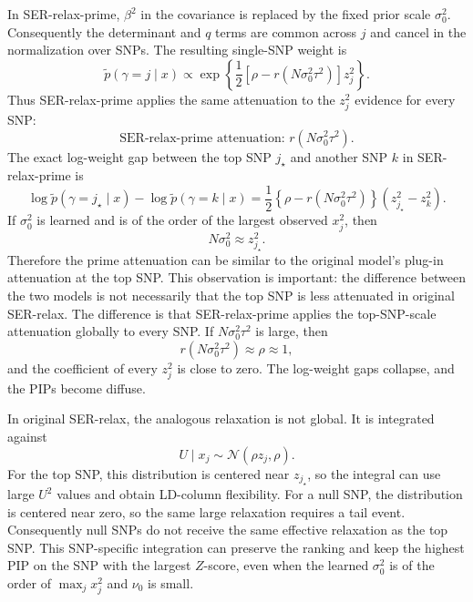 \documentclass[11pt]{article}
\newcommand{\Normal}{\mathcal N}
\begin{document}
In SER-relax-prime, $\beta^2$ in the covariance is replaced by the fixed prior
scale $\sigma_0^2$. Consequently the determinant and $q$ terms are common
across $j$ and cancel in the normalization over SNPs. The resulting single-SNP
weight is
\[
\tilde p(\gamma=j \mid x)
\propto
\exp\left\{
\frac{1}{2}
\left[
\rho-r(N\sigma_0^2\tau^2)
\right]z_j^2
\right\}.
\]
Thus SER-relax-prime applies the same attenuation to the $z_j^2$ evidence for
every SNP:
\[
\text{SER-relax-prime attenuation: } r(N\sigma_0^2\tau^2).
\]
The exact log-weight gap between the top SNP $j_\star$ and another SNP $k$ in
SER-relax-prime is
\[
\log \tilde p(\gamma=j_\star\mid x)
-
\log \tilde p(\gamma=k\mid x)
=
\frac{1}{2}
\left\{\rho-r(N\sigma_0^2\tau^2)\right\}
(z_{j_\star}^2-z_k^2).
\]
If $\sigma_0^2$ is learned and is of the order of the largest observed
$x_j^2$, then
\[
N\sigma_0^2 \approx z_{j_\star}^2.
\]
Therefore the prime attenuation can be similar to the original model's
plug-in attenuation at the top SNP. This observation is important: the
difference between the two models is not necessarily that the top SNP is less
attenuated in original SER-relax. The difference is that SER-relax-prime
applies the top-SNP-scale attenuation globally to every SNP. If
$N\sigma_0^2\tau^2$ is large, then
\[
r(N\sigma_0^2\tau^2)\approx \rho\approx 1,
\]
and the coefficient of every $z_j^2$ is close to zero. The log-weight gaps
collapse, and the PIPs become diffuse.

In original SER-relax, the analogous relaxation is not global. It is integrated
against
\[
U\mid x_j \sim \Normal(\rho z_j,\rho).
\]
For the top SNP, this distribution is centered near $z_{j_\star}$, so the
integral can use large $U^2$ values and obtain LD-column flexibility. For a
null SNP, the distribution is centered near zero, so the same large relaxation
requires a tail event. Consequently null SNPs do not receive the same effective
relaxation as the top SNP. This SNP-specific integration can preserve the
ranking and keep the highest PIP on the SNP with the largest $Z$-score, even
when the learned $\sigma_0^2$ is of the order of $\max_j x_j^2$ and
$\nu_0$ is small.
\end{document}

